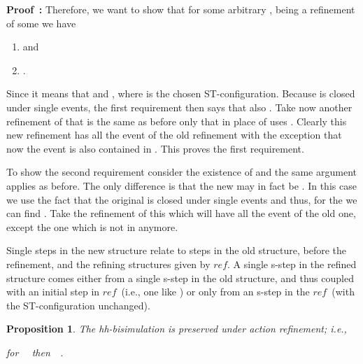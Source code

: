 \documentclass[submission,copyright,creativecommons]{eptcs}
\newtheorem{proposition}[theorem]{Proposition}
\newenvironment{proof}[1][\!\!\,]{\vspace{1ex}\noindent\textbf{Proof #1: }}{\hfill\vspace{2ex}}
\newcommand{\cp}[1]{}
\newcounter{case}
\newcommand\reffun{\ensuremath{\mathit{ref}}}
\begin{document}
\begin{proof}
Therefore, we want to show that for some arbitrary , being a refinement of some  we have
\begin{enumerate}
\item  and
\item .
\end{enumerate}
Since  it means that  and , where  is the chosen ST-configuration. Because  is closed under single events, the first requirement then says that also . Take now another refinement of  that is the same as before only that in place of  uses . Clearly this new refinement has all the event of the old refinement with the exception that now the event  is also contained in . This proves the first requirement.

To show the second requirement consider the existence of  and the same argument applies as before. The only difference is that the new  may in fact be . In this case we use the fact that the original  is closed under single events and thus, for the  we can find . Take the refinement of this which will have all the event of the old one, except the one  which is not in  anymore.
\end{proof}

Single steps in the new structure relate to steps in the old structure, before the refinement, and the refining structures given by \reffun. A single s-step in the refined structure comes either from a single s-step in the old structure, and thus coupled with an initial step in \reffun\ (i.e., one like ) or only from an s-step in the \reffun\ (with the ST-configuration unchanged). \cp{What about t-steps??}

\begin{proposition}\label{prop_hhPreserved}
The hh-bisimulation is preserved under action refinement; i.e., 

\centerline{for \ \ then\ \ .}
\end{proposition}
\end{document}
